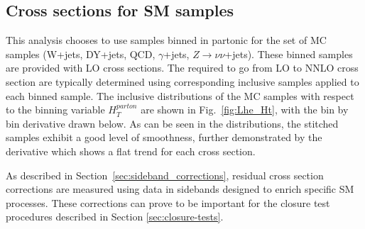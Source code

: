 \subsection{Cross sections for SM samples}
\label{sec:SMxs}
This analysis chooses to use \MADGRAPH samples binned in partonic \HT 
for the set of MC samples (W+jets, DY+jets, QCD, $\gamma$+jets, $Z\rightarrow \nu\nu$+jets).
These binned samples are provided with LO cross sections. 
The \kfactors required to go from LO to NNLO cross section are typically determined using corresponding
inclusive samples applied to each \HT binned sample.
The inclusive distributions of the MC samples
with respect to the binning variable
$H_{T}^{parton}$ are shown in Fig.~\ref{fig:Lhe_Ht}, with
the bin by bin derivative drawn below. 
As can be seen in the distributions, the stitched samples
exhibit a good level of smoothness,
further demonstrated by the derivative which shows a flat trend for each 
cross section.

As described in Section~\ref{sec:sideband_corrections}, residual cross
section corrections are measured using data in sidebands designed to
enrich specific SM processes. These corrections can prove to be
important for the closure test procedures described in Section
\ref{sec:closure-tests}.

